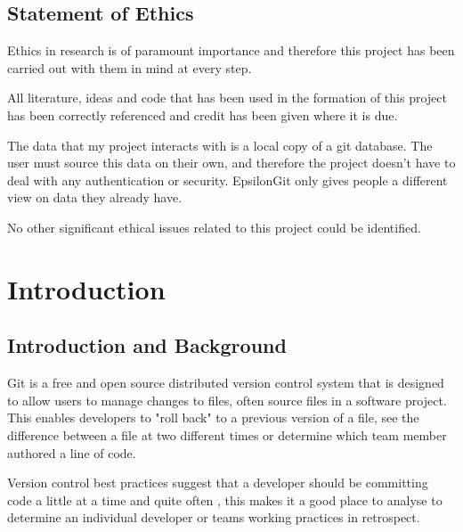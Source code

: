 \documentclass[11pt]{book}
\begin{document}
\section*{Statement of Ethics}
Ethics in research is of paramount importance and therefore this project has been carried out with them in mind at every step. 

All literature, ideas and code that has been used in the formation of this project has been correctly referenced and credit has been given where it is due.

The data that my project interacts with is a local copy of a git database. The user must source this data on their own, and therefore the project doesn't have to deal with any authentication or security. EpsilonGit only gives people a different view on data they already have.

No other significant ethical issues related to this project could be identified.

\tableofcontents

\listoffigures
 
\listoftables

\chapter{Introduction}
\label{introandbackground}
\section{Introduction and Background}
	
Git is a free and open source distributed version control system \cite{gitintro} that is designed to allow users to manage changes to files, often source files in a software project. This enables developers to "roll back" to a previous version of a file, see the difference between a file at two different times or determine which team member authored a line of code. 

Version control best practices suggest that a developer should be committing code a little at a time and quite often \cite{gitbestpractices}, this makes it a good place to analyse to determine an individual developer or teams working practices in retrospect.
\end{document}
